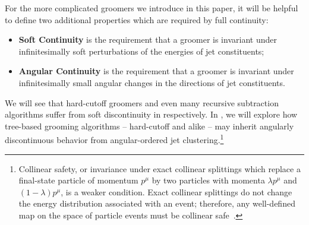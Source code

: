 \documentclass[letterpaper,11pt]{article}
\begin{document}
For the more complicated \PIRANHA{} groomers we introduce in this paper, it will be helpful to define two additional properties which are required by full continuity:
\begin{itemize}
    \item
    \textbf{Soft Continuity} is the requirement that a groomer is invariant under infinitesimally soft perturbations of the energies of jet constituents;

    \item
    \textbf{Angular Continuity} is the requirement that a groomer is invariant under infinitesimally small angular changes in the directions of jet constituents.
\end{itemize}

We will see that hard-cutoff groomers and even many recursive subtraction algorithms suffer from soft discontinuity in  respectively.
%
In , we will explore how tree-based grooming algorithms -- hard-cutoff and \PIRANHA{} alike -- may inherit angularly discontinuous behavior from angular-ordered jet clustering.\footnote{
Collinear safety, or invariance under exact collinear splittings which replace a final-state particle of momentum \(p^\mu\) by two particles with momenta \(\lambda p^\mu\) and \((1-\lambda) p^\mu\), is a weaker condition.
%
Exact collinear splittings do not change the energy distribution associated with an event; therefore, any well-defined map on the space of particle events must be collinear safe~\cite{Komiske:2020qhg}.
}
\end{document}
